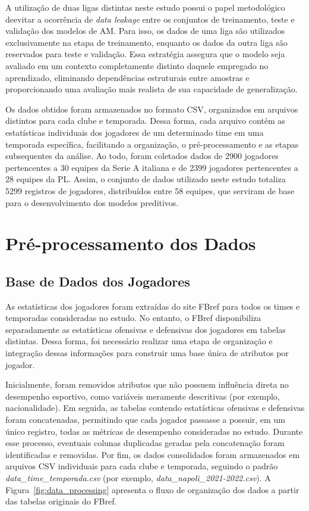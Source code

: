 A utilização de duas ligas distintas neste estudo possui o papel metodológico deevitar a ocorrência de \textit{data leakage} entre os conjuntos de 
treinamento, teste e validação dos modelos de AM. Para isso, os dados de uma liga são utilizados exclusivamente na etapa de treinamento, enquanto os 
dados da outra liga são reservados para teste e validação. Essa estratégia assegura que o modelo seja avaliado em um contexto completamente distinto daquele empregado no 
aprendizado, eliminando dependências estruturais entre amostras e proporcionando uma avaliação mais realista de sua capacidade de generalização.

Os dados obtidos foram armazenados no formato CSV, organizados em arquivos distintos para cada clube e temporada. Dessa forma, cada arquivo contém as estatísticas 
individuais dos jogadores de um determinado time em uma temporada específica, facilitando a organização, o pré-processamento e as etapas subsequentes da análise. 
Ao todo, foram coletados dados de 2900 jogadores pertencentes a 30 equipes da Serie A italiana e de 2399 jogadores pertencentes a 28 equipes da 
PL. Assim, o conjunto de dados utilizado neste estudo totaliza 5299 registros de jogadores, distribuídos entre 58 equipes, 
que serviram de base para o desenvolvimento dos modelos preditivos.

\section{Pré-processamento dos Dados}

\subsection{Base de Dados dos Jogadores}

As estatísticas dos jogadores foram extraídas do site FBref \cite{fbref} para todos os times e temporadas consideradas no estudo. No entanto, 
o FBref disponibiliza separadamente as estatísticas ofensivas e defensivas dos jogadores em tabelas distintas. Dessa forma, foi necessário realizar uma etapa 
de organização e integração dessas informações para construir uma base única de atributos por jogador.

Inicialmente, foram removidos atributos que não possuem influência direta no desempenho esportivo, como variáveis meramente descritivas (por exemplo, nacionalidade). 
Em seguida, as tabelas contendo estatísticas ofensivas e defensivas foram concatenadas, permitindo que cada jogador passasse a possuir, em um único registro, todas 
as métricas de desempenho consideradas no estudo. Durante esse processo, eventuais colunas duplicadas geradas pela concatenação foram identificadas e removidas. 
Por fim, os dados consolidados foram armazenados em arquivos CSV individuais para cada clube e temporada, seguindo o padrão \textit{data\_time\_temporada.csv} 
(por exemplo, \textit{data\_napoli\_2021-2022.csv}). A Figura~\ref{fig:data_processing} apresenta o fluxo de organização dos dados a partir das tabelas originais do FBref.

